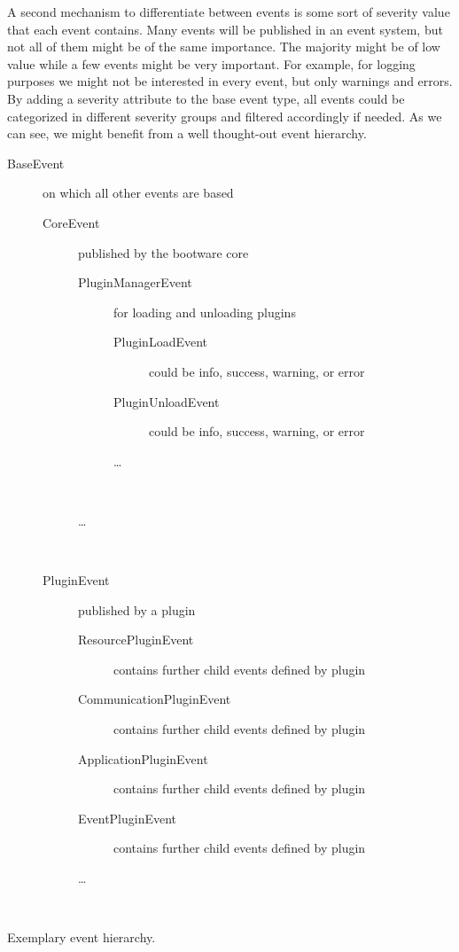 A second mechanism to differentiate between events is some sort of severity value that each event contains.
Many events will be published in an event system, but not all of them might be of the same importance.
The majority might be of low value while a few events might be very important.
For example, for logging purposes we might not be interested in every event, but only warnings and errors.
By adding a severity attribute to the base event type, all events could be categorized in different severity groups and filtered accordingly if needed.
As we can see, we might benefit from a well thought-out event hierarchy.

\vspace*{\baselineskip}
\begingroup
	\centering
	\captionsetup{type=figure}
	\begin{description}
		\item[BaseEvent] on which all other events are based
		\begin{description}
			\item[CoreEvent] published by the bootware core
			\begin{description}
				\item[PluginManagerEvent] for loading and unloading plugins
				\begin{description}
					\item[PluginLoadEvent] could be info, success, warning, or error
					\item[PluginUnloadEvent] could be info, success, warning, or error
					\item[\ldots] ~
				\end{description}
				\item[\ldots] ~
			\end{description}
		\end{description}
		\begin{description}
			\item[PluginEvent] published by a plugin
			\begin{description}
				\item[ResourcePluginEvent] contains further child events defined by plugin
				\item[CommunicationPluginEvent] contains further child events defined by plugin
				\item[ApplicationPluginEvent] contains further child events defined by plugin
				\item[EventPluginEvent] contains further child events defined by plugin
				\item[\ldots] ~
			\end{description}
		\end{description}
	\end{description}
	\caption{Exemplary event hierarchy.}
	\label{figure:eventhierarchy}
\endgroup

